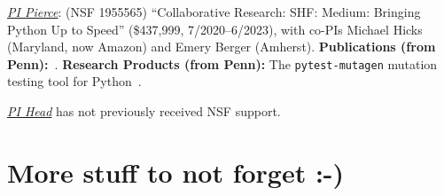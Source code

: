 

\emph{\underline{PI Pierce}}: (NSF 1955565) ``Collaborative Research:
SHF: Medium: Bringing Python Up to Speed'' (\$437,999, 7/2020--6/2023), with co-PIs Michael Hicks (Maryland, now Amazon) and Emery
Berger (Amherst).
{\bf Publications (from Penn):}~\cite{DBLP:conf/esop/GoldsteinHLP21,goldstein2022parsing}.
{\bf Research Products (from Penn):} The {\tt pytest-mutagen} mutation
testing tool for Python~\cite{pytestmutagen}.

\emph{\underline{PI Head}} has not previously received NSF support.

%

\iflater
\section*{More stuff to not forget :-)}

